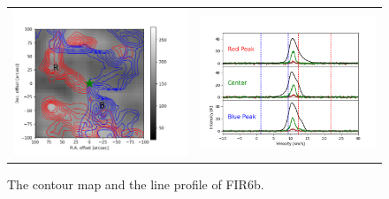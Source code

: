\begin{figure}[h!]
	\begin{center}
		\begin{tabular}{cc}
			\includegraphics[width=7cm]{Orion_12CO2-1_FIR6b_rbcontour_400_modified.png} &   \includegraphics[width=7cm]{Orion_12CO2-1_FIR6b_line_profile_400.png}\\
		\end{tabular}
		\label{FIR6b21}
		\caption{The contour map and the line profile of FIR6b. }
	\end{center}
\end{figure}

